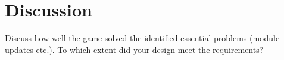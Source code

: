 \section{Discussion}
Discuss how well the game solved the identified essential problems (module updates etc.).
To which extent did your design meet the requirements?
